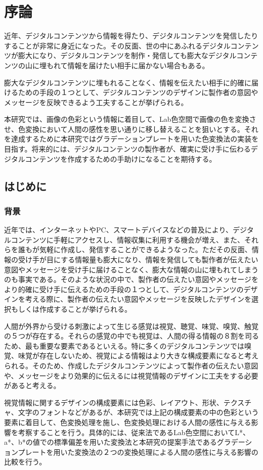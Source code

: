 \chapter{序論}


近年、デジタルコンテンツから情報を得たり、デジタルコンテンツを発信したりすることが非常に身近になった。その反面、世の中にあふれるデジタルコンテンツが膨大になり、デジタルコンテンツを制作・発信しても膨大なデジタルコンテンツの山に埋もれて情報を届けたい相手に届かない場合もある。\par
膨大なデジタルコンテンツに埋もれることなく、情報を伝えたい相手に的確に届けるための手段の１つとして、デジタルコンテンツのデザインに製作者の意図やメッセージを反映できるよう工夫することが挙げられる。\par
本研究では、画像の色彩という情報に着目して、Lab色空間で画像の色を変換させ、色変換において人間の感性を思い通りに移し替えることを狙いとする。それを達成するために本研究ではグラデーションプレートを用いた色変換法の実装を目指す。将来的には、デジタルコンテンツの製作者が、確実に受け手に伝わるデジタルコンテンツを作成するための手助けになることを期待する。


\section{はじめに}
\subsection{背景}
近年では、インターネットやPC、スマートデバイスなどの普及により、デジタルコンテンツに手軽にアクセスし、情報収集に利用する機会が増え、また、それらを誰もが気軽に作成し、発信することができるようなった。ただその反面、情報の受け手が目にする情報量も膨大になり、情報を発信しても製作者が伝えたい意図やメッセージを受け手に届けることなく、膨大な情報の山に埋もれてしまうのも事実である。そのような状況の中で、製作者の伝えたい意図やメッセージをより的確に受け手に伝えるための手段の１つとして、デジタルコンテンツのデザインを考える際に、製作者の伝えたい意図やメッセージを反映したデザインを選択もしくは作成することが挙げられる。\par
人間が外界から受ける刺激によって生じる感覚は視覚、聴覚、味覚、嗅覚、触覚の５つが存在する。それらの感覚の中でも視覚は、人間の得る情報の８割を司るため、最も重要な要素であるといえる。特に多くのデジタルコンテンツでは嗅覚、味覚が存在しないため、視覚による情報はより大きな構成要素になると考えられる。そのため、作成したデジタルコンテンツによって製作者の伝えたい意図や、メッセージをより効果的に伝えるには視覚情報のデザインに工夫をする必要があると考える。　\par
視覚情報に関するデザインの構成要素には色彩、レイアウト、形状、テクスチャ、文字のフォントなどがあるが、本研究では上記の構成要素の中の色彩という要素に着目して、色変換処理を施し、色変換処理における人間の感性に与える影響を考察することを行う。具体的には、従来法\cite{1}であるLab色空間においてL*、a*、b*の値での標準偏差を用いた変換法と本研究の提案手法であるグラデーションプレートを用いた変換法の２つの変換処理による人間の感性に与える影響の比較を行う。


